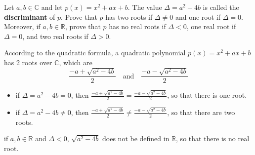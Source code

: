 
\begin{exercise}
\label{exDiscriminantRealRoots}
Let $a,b \in \mathbb{C}$ and let $p(x)=x^2+ax+b$. The value $\Delta=a^2-4b$ is called the \textbf{discriminant} of $p$. Prove that $p$ has two roots if $\Delta \ne 0$ and one root if $\Delta = 0$. Moreover, if $a,b \in \mathbb{R}$, prove that $p$ has no real roots if $\Delta < 0$, one real root if $\Delta = 0$, and two real roots if $\Delta > 0$.
\end{exercise}

\begin{solution}
According to the quadratic formula, a quadratic polynomial $p(x) = x^2+ax+b$ has 2 roots over $\mathbb{C}$, which are
\[ \frac{-a+\sqrt{a^2-4b}}{2} \quad \text{and} \quad \frac{-a-\sqrt{a^2-4b}}{2} \]
\begin{itemize}
\item if $\Delta=a^2-4b=0$, then $ \frac{-a+\sqrt{a^2-4b}}{2} = \frac{-a-\sqrt{a^2-4b}}{2}$, so that there is one root.
\item if $\Delta=a^2-4b \ne 0$, then $ \frac{-a+\sqrt{a^2-4b}}{2} \ne \frac{-a-\sqrt{a^2-4b}}{2}$, so that there are two roots.
\end{itemize}
if $a,b \in \mathbb{R}$ and $\Delta < 0$, $\sqrt{a^2-4b}$ does not be defined in $\mathbb{R}$, so that there is no real root.
\end{solution}